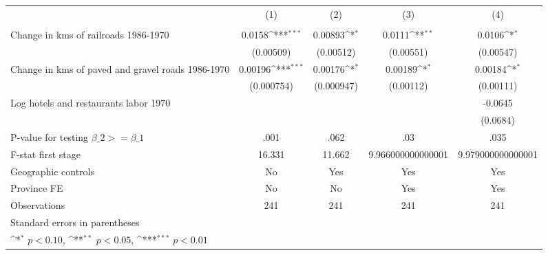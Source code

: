 {
\def\sym#1{\ifmmode^{#1}\else\(^{#1}\)\fi}
\begin{tabular}{l*{4}{c}}
\hline\hline
                &\multicolumn{1}{c}{(1)}&\multicolumn{1}{c}{(2)}&\multicolumn{1}{c}{(3)}&\multicolumn{1}{c}{(4)}\\
                &\multicolumn{1}{c}{}&\multicolumn{1}{c}{}&\multicolumn{1}{c}{}&\multicolumn{1}{c}{}\\
\hline
Change in kms of railroads 1986-1970&   0.0158\sym{***}&  0.00893\sym{*}  &   0.0111\sym{**} &   0.0106\sym{*}  \\
                &(0.00509)         &(0.00512)         &(0.00551)         &(0.00547)         \\
[1em]
Change in kms of paved and gravel roads 1986-1970&  0.00196\sym{***}&  0.00176\sym{*}  &  0.00189\sym{*}  &  0.00184\sym{*}  \\
                &(0.000754)         &(0.000947)         &(0.00112)         &(0.00111)         \\
[1em]
Log hotels and restaurants labor 1970&                  &                  &                  &  -0.0645         \\
                &                  &                  &                  & (0.0684)         \\
\hline
P-value for testing $\beta\_{2} >= \beta\_{1}$&     .001         &     .062         &      .03         &     .035         \\
F-stat first stage&   16.331         &   11.662         &9.966000000000001         &9.979000000000001         \\
Geographic controls&       No         &      Yes         &      Yes         &      Yes         \\
Province FE     &       No         &       No         &      Yes         &      Yes         \\
Observations    &      241         &      241         &      241         &      241         \\
\hline\hline
\multicolumn{5}{l}{\footnotesize Standard errors in parentheses}\\
\multicolumn{5}{l}{\footnotesize \sym{*} \(p<0.10\), \sym{**} \(p<0.05\), \sym{***} \(p<0.01\)}\\
\end{tabular}
}
